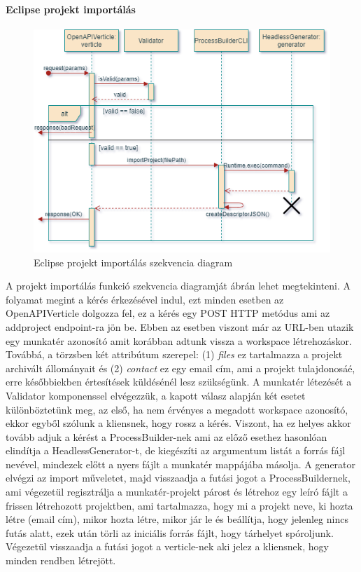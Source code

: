 \paragraph{Eclipse projekt importálás}
\begin{figure}[!ht]
	\includegraphics[width=150mm, keepaspectratio]{figures/add_eclipseproject_seq.png}
	\caption{Eclipse projekt importálás szekvencia diagram}
	\label{fig:addproject}
\end{figure}

A projekt importálás funkció szekvencia diagramját  ábrán lehet megtekinteni. A folyamat megint a kérés érkezésével indul, ezt minden esetben az OpenAPIVerticle dolgozza fel, ez a kérés egy POST HTTP metódus ami az addproject endpoint-ra jön be. Ebben az esetben viszont már az URL-ben utazik egy munkatér azonosító amit korábban adtunk vissza a workspace létrehozáskor. Továbbá, a törzsben két attribútum szerepel: (1) \textit{files} ez tartalmazza a projekt archivált állományait és (2) \textit{contact} ez egy email cím, ami a projekt tulajdonosáé, erre későbbiekben értesítések küldésénél lesz szükségünk. A munkatér létezését a Validator komponenssel elvégezzük, a kapott válasz alapján két esetet különböztetünk meg, az első, ha nem érvényes a megadott workspace azonosító, ekkor egyből szólunk a kliensnek, hogy rossz a kérés. Viszont, ha ez helyes akkor tovább adjuk a kérést a ProcessBuilder-nek ami az előző esethez hasonlóan elindítja a HeadlessGenerator-t, de kiegészíti az argumentum listát a forrás fájl nevével, mindezek előtt a nyers fájlt a munkatér mappájába másolja. A generator elvégzi az import műveletet, majd visszaadja a futási jogot a ProcessBuildernek, ami végezetül regisztrálja a munkatér-projekt párost és létrehoz egy leíró fájlt a frissen létrehozott projektben, ami tartalmazza, hogy mi a projekt neve, ki hozta létre (email cím), mikor hozta létre, mikor jár le és beállítja, hogy jelenleg nincs futás alatt, ezek után törli az iniciális forrás fájlt, hogy tárhelyet spóroljunk. Végezetül visszaadja a futási jogot a verticle-nek aki jelez a kliensnek, hogy minden rendben létrejött.



